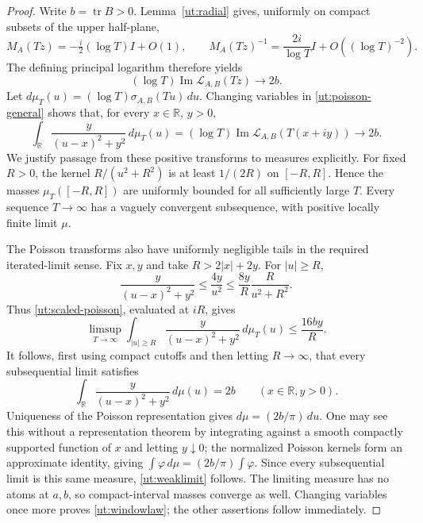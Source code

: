 \begin{proof}
Write $b=\operatorname{tr}B>0$. Lemma~\ref{ut:radial} gives, uniformly on
compact subsets of the upper half-plane,
\[
 M_A(Tz)=-\tfrac i2(\log T)I+O(1),\qquad
 M_A(Tz)^{-1}=\frac{2i}{\log T}I+O((\log T)^{-2}).
\]
The defining principal logarithm therefore yields
\begin{equation}\label{ut:harmonic-limit}
 (\log T)\operatorname{Im}\mathcal L_{A,B}(Tz)
                       \longrightarrow 2b.
\end{equation}
Let $d\mu_T(u)=(\log T)\sigma_{A,B}(Tu)\,du$. Changing variables in
\eqref{ut:poisson-general} shows that, for every $x\in\mathbb R$, $y>0$,
\begin{equation}\label{ut:scaled-poisson}
 \int_{\mathbb R}\frac{y}{(u-x)^2+y^2}\,d\mu_T(u)
        =(\log T)\operatorname{Im}\mathcal L_{A,B}(T(x+iy))
        \longrightarrow 2b.
\end{equation}
We justify passage from these positive transforms to measures explicitly.
For fixed $R>0$, the kernel $R/(u^2+R^2)$ is at least $1/(2R)$ on
$[-R,R]$. Hence the masses $\mu_T([-R,R])$ are uniformly bounded for
all sufficiently large $T$. Every sequence $T\to\infty$ has a vaguely
convergent subsequence, with positive locally finite limit $\mu$.

The Poisson transforms also have uniformly negligible tails in the
required iterated-limit sense. Fix $x,y$ and take $R>2|x|+2y$.
For $|u|\ge R$,
\[
 \frac{y}{(u-x)^2+y^2}
       \leq\frac{4y}{u^2}
       \leq\frac{8y}{R}\frac{R}{u^2+R^2}.
\]
Thus \eqref{ut:scaled-poisson}, evaluated at $iR$, gives
\[
 \limsup_{T\to\infty}
 \int_{|u|\ge R}\frac{y}{(u-x)^2+y^2}\,d\mu_T(u)
             \leq\frac{16by}{R}.
\]
It follows, first using compact cutoffs and then letting $R\to\infty$,
that every subsequential limit satisfies
\[
 \int_{\mathbb R}\frac{y}{(u-x)^2+y^2}\,d\mu(u)=2b
                       \qquad(x\in\mathbb R, y>0).
\]
Uniqueness of the Poisson representation gives
$d\mu=(2b/\pi)\,du$. One may see this without a representation theorem
by integrating against a smooth compactly supported function of $x$ and
letting $y\downarrow0$; the normalized Poisson kernels form an approximate
identity, giving $\int\varphi\,d\mu=(2b/\pi)\int\varphi$.
Since every subsequential limit is this same measure,
\eqref{ut:weaklimit} follows. The limiting measure has no atoms at $a,b$,
so compact-interval masses converge as well. Changing variables once more
proves \eqref{ut:windowlaw}; the other assertions follow immediately.
\end{proof}

